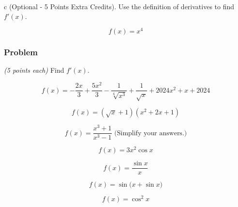 \documentclass[
  letterpaper,
  DIV=11,
  numbers=noendperiod]{scrartcl}
\begin{document}
\hfill\break
\hfill\break
\hfill\break
\hfill\break

\hfill\break
\hfill\break
\hfill\break
\hfill\break

\hfill\break
\hfill\break
\hfill\break
\hfill\break

\hfill\break
\hfill\break
\hfill\break
\hfill\break

\hfill\break
\hfill\break
\hfill\break
\hfill\break

\thispagestyle{empty}

c (Optional - 5 Points Extra Credits). Use the definition of derivatives
to find \(f'(x)\).

\[
f(x) = x^4
\]

\hfill\break
\hfill\break
\hfill\break
\hfill\break

\hfill\break
\hfill\break
\hfill\break
\hfill\break

\hfill\break
\hfill\break
\hfill\break
\hfill\break

\subsubsection{Problem}\label{problem-4}

\emph{(5 points each)} Find \(f'(x)\).

\[f(x) =  -\frac{2x}{3} + \frac{5x^2}{3} - \frac{1}{\sqrt[6]{x^3}} + \frac{1}{\sqrt{x}} + 2024x^2 + x + 2024\]

\hfill\break
\hfill\break
\hfill\break
\hfill\break

\[f(x) = (\sqrt{x}+1)(x^2+2x+1)\]

\hfill\break
\hfill\break
\hfill\break
\hfill\break
\hfill\break

\[f(x) = \frac{x^3+1}{x^3-1} \text{   (Simplify your answers.)}\]

\hfill\break
\thispagestyle{empty}

\[f(x) = 3x^2\cos x\]

\hfill\break
\hfill\break
\hfill\break
\hfill\break
\hfill\break

\[f(x) = \frac{\sin x}{x}\]

\hfill\break
\hfill\break
\hfill\break
\hfill\break
\hfill\break

\[f(x) = \sin \bigg(x + \sin x \bigg)\]

\hfill\break
\hfill\break
\hfill\break
\hfill\break
\hfill\break

\[f(x) = \cos^{2}x\]

\hfill\break
\hfill\break
\hfill\break
\hfill\break
\hfill\break
\end{document}

